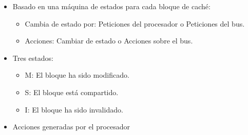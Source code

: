 \documentclass[12pt, twoside, openright]{report} %
\begin{document}
    \begin{itemize}
    \item
      Basado en una máquina de estados para cada bloque de caché:

      \begin{itemize}
      
      \item
        Cambia de estado por: Peticiones del procesador o Peticiones
        del bus.
      \item
        Acciones: Cambiar de estado o Acciones sobre el bus.
      \end{itemize}
    \item
      Tres estados:

      \begin{itemize}
      
      \item
        M: El bloque ha sido modificado.
      \item
        S: El bloque está compartido.
      \item
        I: El bloque ha sido invalidado.
      \end{itemize}
      \pagebreak
    \item
      Acciones generadas por el procesador


\end{itemize}
\end{document}
